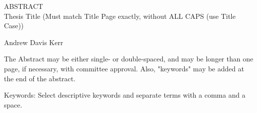 \begin{center}
\thispagestyle{empty}
ABSTRACT \\
Thesis Title (Must match Title Page exactly, without ALL CAPS (use Title Case))

Andrew Davis Kerr
\end{center}

The Abstract may be either single- or double-spaced, and may be longer than one page, if necessary, with committee approval. Also, "keywords" may be added at the end of the abstract.

Keywords: Select descriptive keywords and separate terms with a comma and a space.
\clearpage